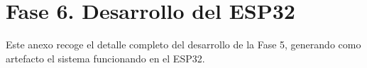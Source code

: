 \documentclass[../main.tex]{subfiles}
\begin{document}
	\chapter{Fase 6. Desarrollo del ESP32}
	\label{sec:DerarrolloFase6}
	
	Este anexo recoge el detalle completo del desarrollo de la Fase 5, generando como artefacto el sistema funcionando en el ESP32.
	
	
	\clearpage
	
	
\end{document}
